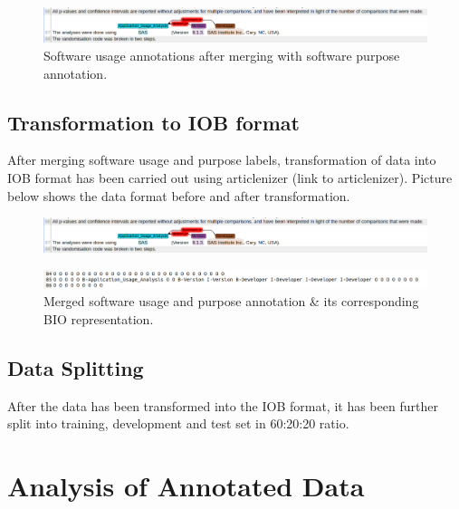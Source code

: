 \begin{figure}[htbp]
	\centering
	\includegraphics[width=.95\textwidth]{4.graphics/figures/chap4/merging/2002515_plm}
	\caption{Software usage annotations after merging with software purpose  annotation.}
	\label{fig:chapter04:setup}
\end{figure}




\subsection{Transformation to IOB format}
\label{subsec:dataset:preprocessing:Transformation}
After merging software usage and purpose labels, transformation of data into IOB format has been carried out using articlenizer (link to articlenizer). Picture below shows the data format before and after transformation. 

\begin{figure}[htbp]
	\centering
	\includegraphics[width=.95\textwidth]{4.graphics/figures/chap4/merging/2002515_plm}
	
	\label{fig:chapter04:setup}
\end{figure}

\begin{figure}[htbp]
	\centering
	\includegraphics[width=.95\textwidth]{4.graphics/figures/chap4/merging/BIo_2002515_plosmeth}
	\caption{Merged software usage and purpose annotation \& its corresponding BIO representation.}
	\label{fig:chapter04:setup}
\end{figure}

\subsection{Data Splitting}
\label{subsec:dataset:preprocessing:Splitting}
After the data has been transformed into the IOB format, it has been further split into training, development and test set in 60:20:20 ratio.


\section{Analysis of Annotated Data}
\label{sec:dataset:Analysis}

